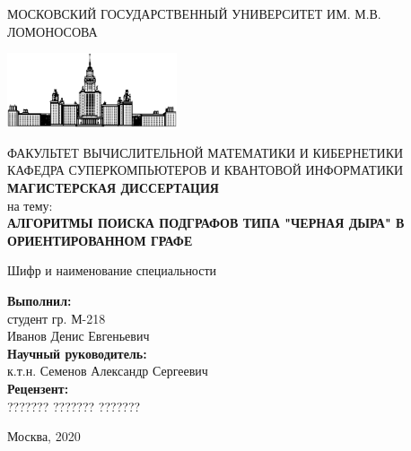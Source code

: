 \documentclass[12pt,a4paper,oneside]{article}
\begin{document}
\begin{titlepage}
    \begin{center}

    \bigskip

    \uppercase{Московский государственный университет им. М.В. Ломоносова} \\

    \bigskip

    \includegraphics[width=50mm]{msu.eps}

    \bigskip
    \uppercase{Факультет вычислительной математики и кибернетики} \\
    \uppercase{Кафедра суперкомпьютеров и квантовой информатики} \\
    \bigskip
    \uppercase{\Huge\bfseries Магистерская диссертация} \\
    {\large на тему:} \\
    \uppercase{\large\bfseries Алгоритмы поиска подграфов типа "черная дыра" в ориентированном графе}

    \bigskip
    Шифр и наименование специальности

    \end{center}

    \bigskip
    \begin{flushright}
        \begin{minipage}{7cm}
            {\bfseries Выполнил:} \\
            студент гр. М-218 \\
            Иванов Денис Евгеньевич \\

            {\bfseries Научный руководитель:} \\
            к.т.н. Семенов Александр Сергеевич \\

            {\bfseries Рецензент:} \\
            ??????? ??????? ???????
        \end{minipage}
    \end{flushright}

    \vfill

    \begin{center}
    {\large Москва, 2020}
    \end{center}

\end{titlepage}
\end{document}
